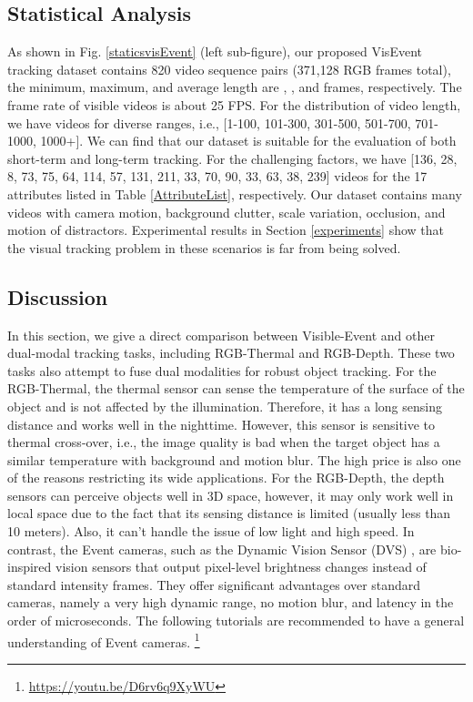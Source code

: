 \documentclass[journal]{IEEEtran}
\begin{document}
\subsection{Statistical Analysis} 
As shown in Fig. \ref{staticsvisEvent} (left sub-figure), our proposed VisEvent tracking dataset contains 820 video sequence pairs (371,128 RGB frames total), the minimum, maximum, and average length are , , and  frames, respectively. The frame rate of visible videos is about 25 FPS.  
For the distribution of video length, we have  videos for diverse ranges, i.e., [1-100, 101-300, 301-500, 501-700, 701-1000, 1000+]. We can find that our dataset is suitable for the evaluation of both short-term and long-term tracking. 
For the challenging factors, we have [136, 28, 8, 73, 75, 64, 114, 57, 131, 211, 33, 70, 90, 33, 63, 38, 239] videos for the 17 attributes listed in Table \ref{AttributeList}, respectively. Our dataset contains many videos with camera motion, background clutter, scale variation, occlusion, and motion of distractors. Experimental results in Section \ref{experiments} show that the visual tracking problem in these scenarios is far from being solved.











\subsection{Discussion}
In this section, we give a direct comparison between Visible-Event and other dual-modal tracking tasks, including RGB-Thermal and RGB-Depth. These two tasks also attempt to fuse dual modalities for robust object tracking. For the RGB-Thermal, the thermal sensor can sense the temperature of the surface of the object and is not affected by the illumination. Therefore, it has a long sensing distance and works well in the nighttime. However, this sensor is sensitive to thermal cross-over, i.e., the image quality is bad when the target object has a similar temperature with background and motion blur. The high price is also one of the reasons restricting its wide applications. For the RGB-Depth, the depth sensors can perceive objects well in 3D space, however, it may only work well in local space due to the fact that its sensing distance is limited (usually less than 10 meters). Also, it can't handle the issue of low light and high speed. In contrast, the Event cameras, such as the Dynamic Vision Sensor (DVS) \cite{2008dvs}, are bio-inspired vision sensors that output pixel-level brightness changes instead of standard intensity frames. They offer significant advantages over standard cameras, namely a very high dynamic range, no motion blur, and latency in the order of microseconds. The following tutorials are recommended to have a general understanding of Event cameras. \footnote{\url{https://youtu.be/D6rv6q9XyWU}}
\end{document}
